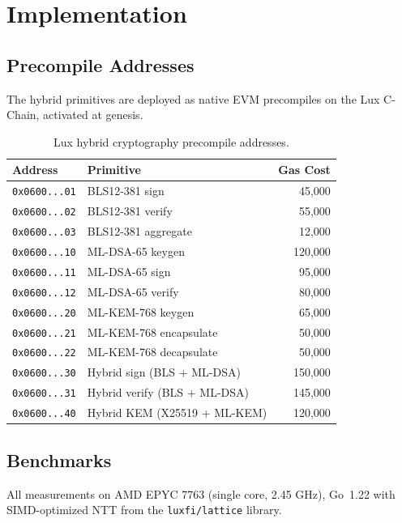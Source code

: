 \section{Implementation}

\label{sec:implementation}

\subsection{Precompile Addresses}

The hybrid primitives are deployed as native EVM precompiles on the Lux C-Chain,
activated at genesis.

\begin{table}[ht]
\centering
\caption{Lux hybrid cryptography precompile addresses.}
\label{tab:precompiles}
\begin{tabular}{llr}
\toprule
\textbf{Address} & \textbf{Primitive} & \textbf{Gas Cost} \\
\midrule
\texttt{0x0600...01} & BLS12-381 sign & 45{,}000 \\
\texttt{0x0600...02} & BLS12-381 verify & 55{,}000 \\
\texttt{0x0600...03} & BLS12-381 aggregate & 12{,}000 \\
\texttt{0x0600...10} & ML-DSA-65 keygen & 120{,}000 \\
\texttt{0x0600...11} & ML-DSA-65 sign & 95{,}000 \\
\texttt{0x0600...12} & ML-DSA-65 verify & 80{,}000 \\
\texttt{0x0600...20} & ML-KEM-768 keygen & 65{,}000 \\
\texttt{0x0600...21} & ML-KEM-768 encapsulate & 50{,}000 \\
\texttt{0x0600...22} & ML-KEM-768 decapsulate & 50{,}000 \\
\texttt{0x0600...30} & Hybrid sign (BLS + ML-DSA) & 150{,}000 \\
\texttt{0x0600...31} & Hybrid verify (BLS + ML-DSA) & 145{,}000 \\
\texttt{0x0600...40} & Hybrid KEM (X25519 + ML-KEM) & 120{,}000 \\
\bottomrule
\end{tabular}
\end{table}

\subsection{Benchmarks}

All measurements on AMD EPYC 7763 (single core, 2.45 GHz), Go~1.22 with SIMD-optimized
NTT from the \texttt{luxfi/lattice} library.

